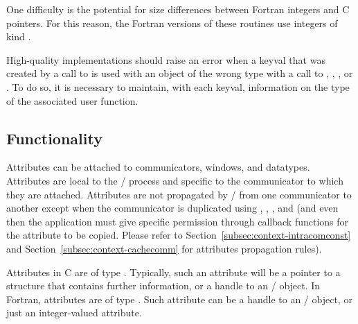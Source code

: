 One difficulty
is the potential for size differences between
Fortran integers and C pointers.
For this reason, the
Fortran versions of these routines
use integers of kind .
\begin{implementors}
High-quality implementations should raise an error when a keyval
%
%
%
that was created by a call to  is
used with an object of the wrong type with a call to
%
%
%
, , , or
. To do so, it is necessary to maintain, with
each keyval, information on the type of the associated user
function.
\end{implementors}

\subsection{Functionality}
\label{subsec:context-cachefunc}

Attributes
can be
attached to communicators,
windows, and datatypes.
Attributes are local to the \MPI/ process and specific to the communicator
to which they are attached. Attributes are not propagated by \MPI/ from one
communicator to another except when the communicator is duplicated
using , ,
, and 
(and even then the application must give specific permission through
callback functions for the attribute to be copied. Please refer to
Section~\ref{subsec:context-intracomconst} and Section~\ref{subsec:context-cachecomm}
for attributes propagation rules).

\begin{users}
Attributes in C are of type . Typically, such an attribute
will be a pointer to a structure that contains further information, or
a handle to an \MPI/ object.
In Fortran, attributes are of type . Such attribute
can be a handle to an \MPI/ object, or just an integer-valued
attribute.
\end{users}

